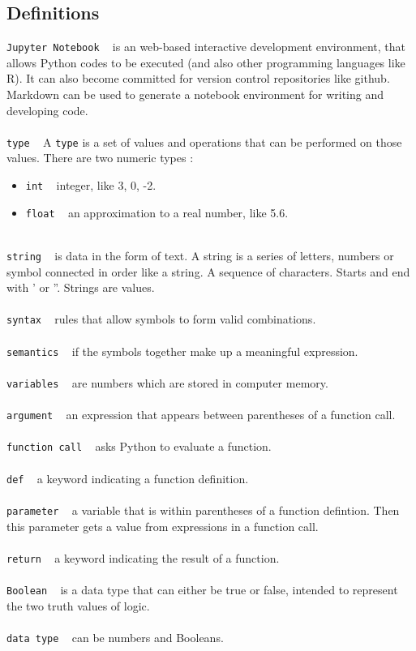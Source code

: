 \documentclass{article}
\begin{document}
\subsection{Definitions}
\texttt{Jupyter Notebook} ~ is an web-based interactive development environment, that allows Python codes to be executed (and also other programming languages like R). It can also become committed for version control repositories like github. Markdown can be used to generate a notebook environment for writing and developing code. \\
\\
\texttt{type} ~ A \texttt{type} is a set of values and operations that can be performed on those values. There are two numeric types : 
\begin{itemize}
\item \texttt{int} ~ integer, like 3, 0, -2.
\item \texttt{float} ~ an approximation to a real number, like 5.6.
\end{itemize}\\
\texttt{string} ~ is data in the form of text. A string is a series of letters, numbers or symbol connected in order like a string. A sequence of characters. Starts and end with ' or ''. Strings are values. \\
\\
\texttt{syntax} ~ rules that allow symbols to form valid combinations.\\
\\
\texttt{semantics} ~ if the symbols together make up a meaningful expression. \\
\\
\texttt{variables} ~ are numbers which are stored in computer memory. \\
\\
\texttt{argument} ~ an expression that appears between parentheses of a function call.\\
\\
\texttt{function call} ~ asks Python to evaluate a function.\\
\\
\texttt{def} ~ a keyword indicating a function definition.\\
\\
\texttt{parameter} ~ a variable that is within parentheses of a function defintion. Then this parameter gets a value from expressions in a function call.\\
\\
\texttt{return} ~ a keyword indicating the result of a function.\\
\\
\texttt{Boolean} ~ is a data type that can either be true or false, intended to represent the two truth values of logic. \\
\\
\texttt{data type} ~ can be numbers and Booleans.\\
\end{document}
